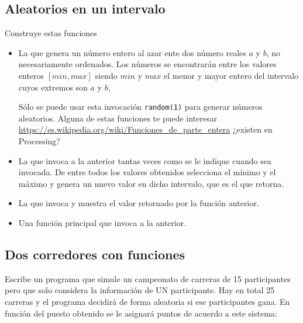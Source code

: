 \separacion
\subsection{Aleatorios en un intervalo}

Construye estas funciones

\begin{itemize}
\item La que genera un número entero al azar ente dos número reales $a$ y $b$, no necesariamente ordenados.
Los números se encontrarán entre los valores enteros $[min, max]$ siendo $min$ y $max$ el menor y mayor entero del intervalo cuyos extremos son $a$ y $b$,

Sólo se puede usar esta invocación {\tt random(1)} para generar números aleatorios. Alguna de estas funciones te puede interesar \url{https://es.wikipedia.org/wiki/Funciones_de_parte_entera} ¿existen en Processing?

\item La que invoca a la anterior tantas veces como se le indique cuando sea invocada. De entre todos los valores obtenidos selecciona el mínimo y el máximo y genera un nuevo valor en dicho intervalo, que es el que retorna.
\item La que invoca y muestra el valor retornado por la función anterior.
\item Una función principal que invoca a la anterior.
\end{itemize}







\separacion
\subsection{Dos corredores con funciones}

Escribe un programa que simule un campeonato de carreras de 15 participantes 
 pero que solo considera la información de UN participante. 
 Hay en total 25 carreras y el programa decidirá de forma aleatoria 
 si ese participantes gana. 
 En función del puesto obtenido se le asignará puntos de acuerdo a este sistema:
 
